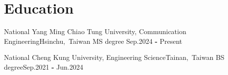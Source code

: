 \section*{Education}
\resumeSubHeadingListStart

\resumeSubheading
{National Yang Ming Chiao Tung University, Communication Engineering}{Hsinchu,\, Taiwan}
{MS degree}
{Sep.\@ 2024 \textbf{-} Present} 

\resumeSubHeadingListEnd

\resumeSubheading
{National Cheng Kung University, Engineering Science}{Tainan,\, Taiwan}
{BS degree}{Sep.\@ 2021 \textbf{-} Jun.2024}

\resumeSubHeadingListEnd

